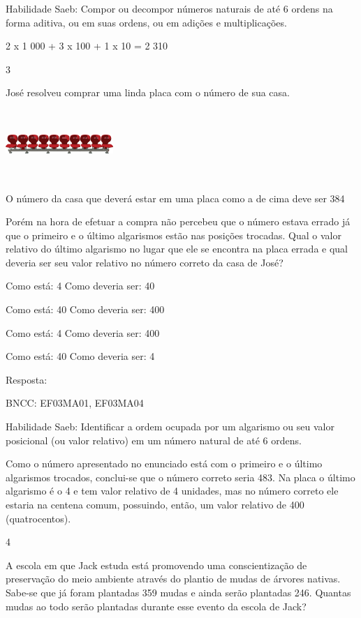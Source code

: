 \begin{escolha}
\begin{escolha}
Habilidade Saeb: Compor ou decompor números naturais de até 6 ordens na
forma aditiva, ou em suas ordens, ou em adições e multiplicações.

2 x 1 000 + 3 x 100 + 1 x 10 = 2 310

\num{3}

José resolveu comprar uma linda placa com o número de sua casa.

\includegraphics[width=1.60256in,height=1.03072in]{media/image107.png}

O número da casa que deverá estar em uma placa como a de cima deve ser
384

Porém na hora de efetuar a compra não percebeu que o número estava
errado já que o primeiro e o último algarismos estão nas posições
trocadas. Qual o valor relativo do último algarismo no lugar que ele se
encontra na placa errada e qual deveria ser seu valor relativo no número
correto da casa de José?

\begin{escolha}
\item
  Como está: 4 Como deveria ser: 40
\item
  Como está: 40 Como deveria ser: 400
\item
  Como está: 4 Como deveria ser: 400
\item
  Como está: 40 Como deveria ser: 4
\end{escolha}

Resposta:

BNCC: EF03MA01, EF03MA04

Habilidade Saeb: Identificar a ordem ocupada por um algarismo ou seu
valor posicional (ou valor relativo) em um número natural de até 6
ordens.

Como o número apresentado no enunciado está com o primeiro e o último
algarismos trocados, conclui-se que o número correto seria 483. Na placa
o último algarismo é o 4 e tem valor relativo de 4 unidades, mas no
número correto ele estaria na centena comum, possuindo, então, um valor
relativo de 400 (quatrocentos).

\num{4}

A escola em que Jack estuda está promovendo uma conscientização de
preservação do meio ambiente através do plantio de mudas de árvores
nativas. Sabe-se que já foram plantadas 359 mudas e ainda serão
plantadas 246. Quantas mudas ao todo serão plantadas durante esse evento
da escola de Jack?


\end{escolha}
\end{escolha}
